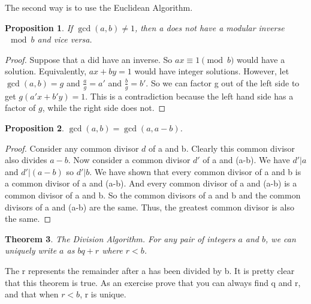 \documentclass[letterpaper]{article}
\theoremstyle{plain}
\newtheorem{thm}{Theorem}[section]
\newtheorem{prop}[thm]{Proposition}
\theoremstyle{definition}
\theoremstyle{remark}
\begin{document}
The second way is to use the Euclidean Algorithm.
\begin{mdframed}
    \begin{prop}
         If $\gcd{(a,b)}\neq 1$, then a does not have a modular inverse $\mod b$ and vice versa.
    \end{prop}
\end{mdframed}
\begin{proof}
    Suppose that a did have an inverse. So $ax \equiv 1 \pmod{b}$ would have a solution. Equivalently, $ax+by = 1$ would have integer solutions. 
However, let $\gcd(a,b) = g$ and $\frac{a}{g} = a'$ and $\frac{b}{g} = b'$. So we can factor g out of the left side to get $g(a'x+b'y) = 1$. This is a contradiction
because the left hand side has a factor of $g$, while the right side does not.
\end{proof}
\begin{mdframed}
    \begin{prop} 
        $\gcd(a,b) = \gcd(a,a-b)$.
    \end{prop}
\end{mdframed}
\begin{proof}
    Consider any common divisor $d$ of a and b. Clearly this common divisor also divides $a-b$.
Now consider a common divisor $d'$ of a and (a-b). We have $d'|a$ and $d' | (a-b)$ so $d'|b$. We have shown that every common divisor of a and b is a common divisor of a and (a-b). 
And every common divisor of a and (a-b) is a common divisor of a and b. So the common divisors of a and b and the common divisors of a and (a-b) are the same. Thus, the greatest common divisor is also the same.
\end{proof}
\begin{mdframed}
    \begin{thm} 
        The Division Algorithm. For any pair of integers $a$ and $b$, we can uniquely write $a$ as $bq + r$ where $r<b$.
    \end{thm}
\end{mdframed}
The r represents the remainder after a has been divided by b. It is pretty clear that this theorem is true. As an exercise prove that you can always find q and r, 
and that when $r < b$, r is unique.
\newline
\newline
\newline
\newline
\end{document}
